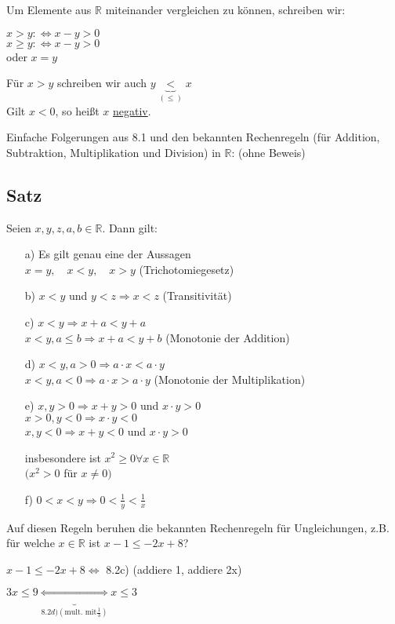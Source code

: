 \documentclass[a4paper, 12pt, twoside] {article}
\begin{document}
Um Elemente aus $\mathbb{R}$ miteinander vergleichen zu können, schreiben wir:

$x > y: \Leftrightarrow x - y > 0$ \\
$x \geq y: \Leftrightarrow x - y > 0$ \\
oder $x = y$

Für $x > y$ schreiben wir auch $y \underbrace{<}_{(\leq)} x$ \\
Gilt $x < 0$, so heißt $x$ \underline{negativ}.

Einfache Folgerungen aus 8.1 und den bekannten Rechenregeln (für Addition, Subtraktion, Multiplikation und Division) in $\mathbb{R}$: (ohne Beweis)

\subsection{Satz} %
Seien $x, y, z, a, b \in \mathbb{R}$. Dann gilt:

\begin{itemize}

\item[a)] Es gilt genau eine der Aussagen \\
$x = y, \quad x < y, \quad x > y$ (Trichotomiegesetz)

\item[b)] $x < y$ und $y < z \Rightarrow x < z$ (Transitivität)

\item[c)] $x < y \Rightarrow x + a < y + a$ \\
$x < y, a \leq b \Rightarrow x + a < y + b$ (Monotonie der Addition)

\item[d)] $x < y, a > 0 \Rightarrow a \cdot x < a \cdot y$ \\
$x < y, a < 0 \Rightarrow a \cdot x > a \cdot y$ (Monotonie der Multiplikation)

\item[e)] $x, y > 0 \Rightarrow x + y > 0$ und $x \cdot y > 0$ \\
$x > 0, y < 0 \Rightarrow x \cdot y < 0$ \\
$x, y < 0 \Rightarrow x + y < 0$ und $x \cdot y > 0$

insbesondere ist $x^2 \geq 0 \forall x \in \mathbb{R}$ \\
$(x^2 > 0$ für $x \neq 0)$

\item[f)] $0 < x < y \Rightarrow 0 < \frac{1}{y} < \frac{1}{x}$

\end{itemize}

Auf diesen Regeln beruhen die bekannten Rechenregeln für Ungleichungen, z.B. für welche $x \in \mathbb{R}$ ist
$x - 1 \leq -2x + 8$?

$x - 1 \leq -2x + 8 \Leftrightarrow$ 8.2c) (addiere 1, addiere 2x)

$3x \leq 9 \underbrace{\Leftrightarrow}_{8.2d) (\text{mult. mit} \frac{1}{3})} x \leq 3$
\end{document}
